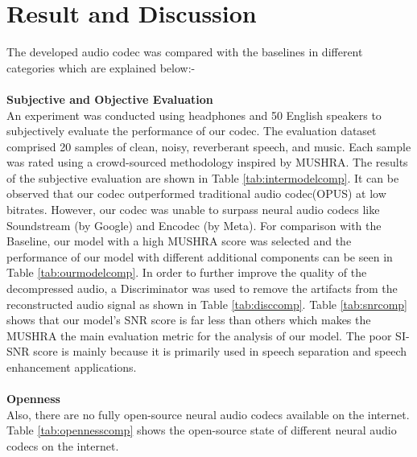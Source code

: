 \documentclass[12pt]{report}
\begin{document}
\chapter{Result and Discussion}
The developed audio codec was compared with the baselines in different categories which are explained below:-\\\\
\textbf{Subjective and Objective Evaluation} \\
An experiment was conducted using headphones and 50 English speakers to subjectively evaluate the performance of our codec. The evaluation dataset comprised 20 samples of clean, noisy, reverberant speech, and music. Each sample was rated using a crowd-sourced methodology inspired by MUSHRA. The results of the subjective evaluation are shown in Table \ref{tab:intermodelcomp}. It can be observed that our codec outperformed traditional audio codec(OPUS) at low bitrates. However, our codec was unable to surpass neural audio codecs like Soundstream (by Google) and Encodec (by Meta). For comparison with the Baseline, our model with a high MUSHRA score was selected and the performance of our model with different additional components can be seen in Table \ref{tab:ourmodelcomp}. In order to further improve the quality of the decompressed audio, a Discriminator was used to remove the artifacts from the reconstructed audio signal as shown in Table \ref{tab:disccomp}. Table \ref{tab:snrcomp} shows that our model's SNR score is far less than others which makes the MUSHRA the main evaluation metric for the analysis of our model. The poor SI-SNR score is mainly because it is primarily used in speech separation and speech enhancement applications.\\\\
\textbf{Openness} \\
Also, there are no fully open-source neural audio codecs available on the internet. Table \ref{tab:opennesscomp} shows the open-source state of different neural audio codecs on the internet. 
 \\\\
\end{document}
